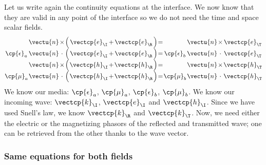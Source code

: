 \begin{refsection}
Let us write again the continuity equations at the interface.
We now know that they are valid in any point of the interface so we do not need the time and space scalar fields.
\begin{equation}
    \arraycolsep=0.5pt%
    \begin{array}{ccccccccccccc}
        & \vectu{n} & \times & \Big( & \vectcp{e}_\I & + & \vectcp{e}_\R & \Big) & = & & \vectu{n} & \times & \vectcp{e}_\T
        \\
        \cp{\epsilon}_a & \vectu{n} & \cdot & \Big( & \vectcp{e}_\I & + & \vectcp{e}_\R & \Big) & = & \cp{\epsilon}_b & \vectu{n} & \cdot & \vectcp{e}_\T
        \\
        & \vectu{n} & \times & \Big( & \vectcp{h}_\I & + & \vectcp{h}_\R & \Big) & = &  & \vectu{n} & \times & \vectcp{h}_\T
        \\
        \cp{\mu}_a & \vectu{n} & \cdot & \Big( & \vectcp{h}_\I & + & \vectcp{h}_\R & \Big) & = & \cp{\mu}_b & \vectu{n} & \cdot & \vectcp{h}_\T
    \end{array}
\end{equation}
We know our media: $\cp{\epsilon}_a$, $\cp{\mu}_a$, $\cp{\epsilon}_b$, $\cp{\mu}_b$.
We know our incoming wave: $\vectcp{k}_\I$, $\vectcp{e}_\I$ and $\vectcp{h}_\I$.
Since we have used Snell's law, we know $\vectcp{k}_\R$ and $\vectcp{k}_\T$.
Now, we need either the electric or the magnetizing phasors of the reflected and transmitted wave; one can be retrieved from the other thanks to the wave vector.




\subsubsection{Same equations for both fields}


\end{refsection}
